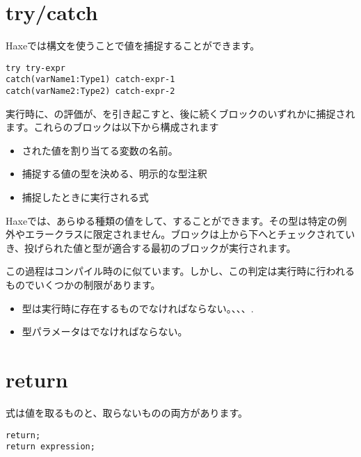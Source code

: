 \section{try/catch}
\label{expression-try-catch}

Haxeでは構文を使うことで値を捕捉することができます。

\begin{lstlisting}
try try-expr
catch(varName1:Type1) catch-expr-1
catch(varName2:Type2) catch-expr-2
\end{lstlisting}

実行時に、の評価が、を引き起こすと、後に続くブロックのいずれかに捕捉されます。これらのブロックは以下から構成されます

\begin{itemize}
	\item {}された値を割り当てる変数の名前。
	\item 捕捉する値の型を決める、明示的な型注釈
	\item 捕捉したときに実行される式
\end{itemize}

Haxeでは、あらゆる種類の値をして、することができます。その型は特定の例外やエラークラスに限定されません。ブロックは上から下へとチェックされていき、投げられた値と型が適合する最初のブロックが実行されます。

この過程はコンパイル時のに似ています。しかし、この判定は実行時に行われるものでいくつかの制限があります。

\begin{itemize}
	\item 型は実行時に存在するものでなければならない。、、、.
	\item 型パラメータはでなければならない。
\end{itemize}

\section{return}
\label{expression-return}

式は値を取るものと、取らないものの両方があります。

\begin{lstlisting}
return;
return expression;
\end{lstlisting}

